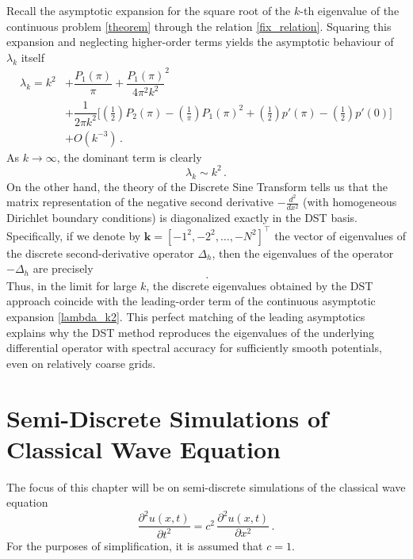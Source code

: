 \documentclass[11pt,a4paper,oneside,openright]{report} %
\begin{document}
Recall the asymptotic expansion for the square root of the $k$-th eigenvalue of the continuous problem \ref{theorem} through the relation \eqref{fix_relation}. Squaring this expansion and neglecting higher-order terms yields the asymptotic behaviour of $\lambda_k$ itself
\begin{equation}
    \begin{split}
    \lambda_k = k^2 & + \dfrac{P_1(\pi)}{\pi} + \dfrac{P_1(\pi)}{4 \pi^2 k^2}^2 \\[2pt] & + \dfrac{1}{2 \pi k ^2} \bigg[ \left(\frac{1}{2}\right)P_2(\pi) - \left( \frac{1}{\pi} \right) P_1(\pi)^2 + \left(\frac{1}{2}\right)p'(\pi) - \left( \frac{1}{2} \right) p'(0)\bigg] \\[2pt] 
    & + O(k^{-3}) \, .
    \end{split}
\end{equation}
As $k \to \infty$, the dominant term is clearly
\begin{equation}\label{lambda_k2}
    \lambda_k \sim k^2 \, .
\end{equation}
On the other hand, the theory of the Discrete Sine Transform tells us that the matrix representation of the negative second derivative $  -\frac{d^2}{dx^2}  $ (with homogeneous Dirichlet boundary conditions) is diagonalized exactly in the DST basis. Specifically, if we denote by $  \boldsymbol{k} = [-1^2, -2^2, \dots, -N^2]^\top  $ the vector of eigenvalues of the discrete second-derivative operator $  \Delta_h  $, then the eigenvalues of the operator $ -\Delta_h  $ are precisely
\begin{equation}
    [1^2, \, 2^2, \, 3^2, \, \dots, \, N^2] \, .
\end{equation}
Thus, in the limit for large $k$, the discrete eigenvalues obtained by the DST approach coincide with the leading-order term of the continuous asymptotic expansion \eqref{lambda_k2}. This perfect matching of the leading asymptotics explains why the DST method reproduces the eigenvalues of the underlying differential operator with spectral accuracy for sufficiently smooth potentials, even on relatively coarse grids.



\chapter{Semi-Discrete Simulations of Classical Wave Equation}
\noindent
The focus of this chapter will be on semi-discrete simulations of the classical wave equation
\begin{equation}\label{eq_wave}
    \frac{\partial^2 u (x, t)}{\partial t^2 } = c^2 \, \frac{\partial^2 u (x, t)}{\partial x^2} \, .
\end{equation}
For the purposes of simplification, it is assumed that $c = 1$.
\end{document}
